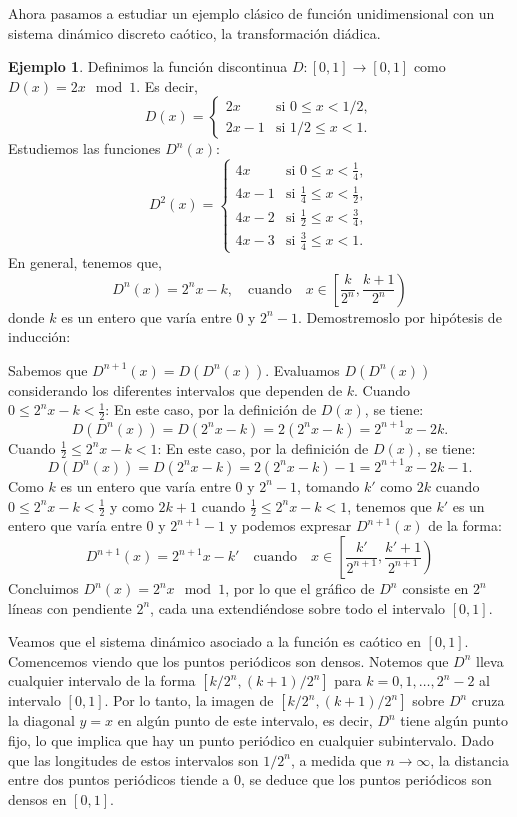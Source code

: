 \documentclass[12pt,a4paper]{report}
\theoremstyle{definition}
\newtheorem{ejemplo}{Ejemplo}[section]
\begin{document}
Ahora pasamos a estudiar un ejemplo clásico de función unidimensional con un sistema dinámico discreto caótico, la transformación diádica.

\begin{ejemplo}
 
Definimos la función discontinua $ D: [0, 1] \to [0, 1] $ como $ D(x) = 2x \mod 1 $. Es decir,
\[
D(x) =
\begin{cases}
2x & \text{si } 0 \leq x < 1/2, \\
2x - 1 & \text{si } 1/2 \leq x < 1.
\end{cases}
\]
%
Estudiemos las funciones $D^n(x)$:
\[
D^2(x) = 
\begin{cases} 
4x & \text{si } 0 \leq x < \frac{1}{4}, \\
4x - 1 & \text{si } \frac{1}{4} \leq x < \frac{1}{2}, \\
4x - 2 & \text{si } \frac{1}{2} \leq x < \frac{3}{4}, \\
4x - 3 & \text{si } \frac{3}{4} \leq x < 1.
\end{cases}
\]
%
En general, tenemos que, 
\[
D^n(x) = 2^n x - k, \quad \text{cuando} \quad x \in \left [\frac{k}{2^n},\frac{k+1}{2^n} \right )
\]
%
donde \( k \) es un entero que varía entre $0$ y $2^n - 1$.
Demostremoslo por hipótesis de inducción:

Sabemos que \( D^{n+1}(x) = D(D^n(x)) \). Evaluamos \( D(D^n(x)) \) considerando los diferentes intervalos que dependen de \( k \).
\newline
Cuando  \( 0 \leq 2^n x - k < \frac{1}{2} \):
En este caso, por la definición de \( D(x) \), se tiene:
\[
D(D^n(x)) = D(2^n x - k) = 2(2^n x - k) = 2^{n+1} x - 2k.
\]
%
Cuando  \( \frac{1}{2} \leq 2^n x - k < 1 \):
En este caso, por la definición de \( D(x) \), se tiene:
\[
D(D^n(x)) = D(2^n x - k) = 2(2^n x - k) - 1 = 2^{n+1} x - 2k - 1.
\]
%
Como $k$ es un entero que varía entre $0$ y $2^n-1$, tomando $k'$ como $2k$ cuando \( 0 \leq 2^n x - k < \frac{1}{2} \) y como $2k+1$ cuando \( \frac{1}{2} \leq 2^n x - k < 1 \), tenemos que $k'$ es un entero que varía entre $0$ y $2^{n+1}-1$ y podemos expresar \( D^{n+1}(x) \) de la forma:
\[
D^{n+1}(x) = 2^{n+1} x - k' \quad \text{cuando} \quad x \in \left [\frac{k'}{2^{n+1}},\frac{k'+1}{2^{n+1}} \right )
\]
%
Concluimos $ D^n(x) = 2^n x \mod 1 $, por lo que el gráfico de $ D^n $ consiste en $ 2^n $ líneas con pendiente $ 2^n $, cada una extendiéndose sobre todo el intervalo $[0,1]$.

Veamos que el sistema dinámico asociado a la función es caótico en $[0,1]$.
Comencemos viendo que los puntos periódicos son densos. Notemos que $ D^n $ lleva cualquier intervalo de la forma $[k/2^n, (k+1)/2^n]$ para $ k = 0, 1, \dots, 2^n - 2 $ al intervalo $[0,1]$. Por lo tanto, la imagen de $[k/2^n, (k+1)/2^n]$ sobre $ D^n $ cruza la diagonal $ y = x $ en algún punto de este intervalo, es decir, $D^n$ tiene algún punto fijo, lo que implica que hay un punto periódico en cualquier subintervalo. Dado que las longitudes de estos intervalos son $ 1/2^n $, a medida que $n \to \infty$, la distancia entre dos puntos periódicos tiende a $0$, se deduce que los puntos periódicos son densos en $[0,1]$.


\end{ejemplo}
\end{document}
